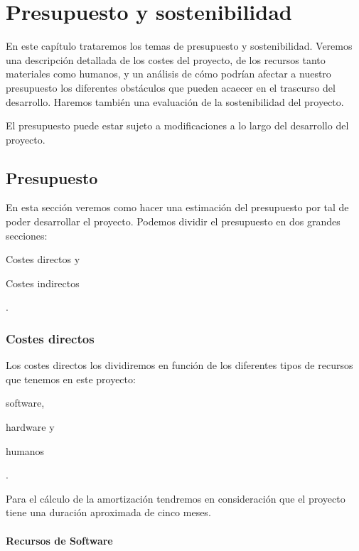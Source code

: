 \documentclass[titlepage,10.5pt]{report}
\begin{document}
\iftrue

\newpage
\tableofcontents*
\fi

\newpage

\chapter{Presupuesto y sostenibilidad}

En este capítulo trataremos los temas de presupuesto y sostenibilidad. Veremos una descripción detallada de los costes del proyecto, de los recursos tanto materiales como humanos, y un análisis de cómo podrían afectar a nuestro presupuesto los diferentes obstáculos que pueden acaecer en el trascurso del desarrollo. Haremos también una evaluación de la sostenibilidad del proyecto.

El presupuesto puede estar sujeto a modificaciones a lo largo del desarrollo del proyecto.

\section{Presupuesto}

En esta sección veremos como hacer una estimación del presupuesto por tal de poder desarrollar el proyecto. Podemos dividir el presupuesto en dos grandes secciones: \begin{enumerate*}[label=\roman*)] \item Costes directos y \item Costes indirectos
\end{enumerate*}.

\subsection{Costes directos}

Los costes directos los dividiremos en función de los diferentes tipos de recursos que tenemos en este proyecto: \begin{enumerate*}[label=\roman*)] \item software, \item hardware y \item humanos \end{enumerate*}.

Para el cálculo de la amortización tendremos en consideración que el proyecto tiene una duración aproximada de cinco meses.

\subsubsection{Recursos de Software}
\end{document}
